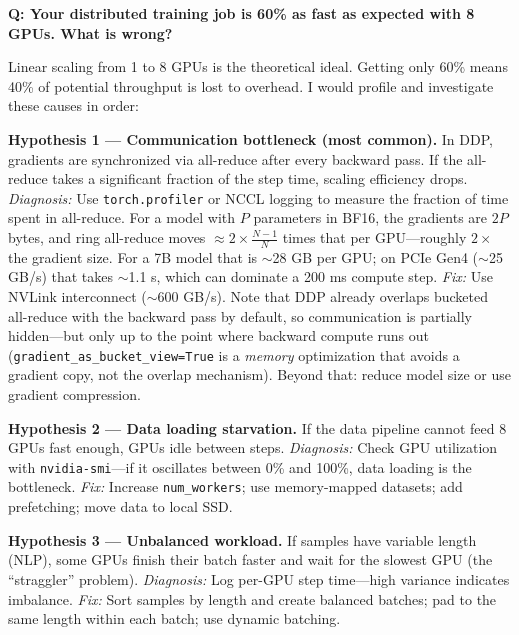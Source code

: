\begin{interviewq}
\textbf{Q: Your distributed training job is 60\% as fast as expected with 8 GPUs. What is wrong?}

 \quad {} \quad \badgefreq{\freqmed}

\stronganswer

Linear scaling from 1 to 8 GPUs is the theoretical ideal. Getting only 60\% means 40\% of potential throughput is lost to overhead. I would profile and investigate these causes in order:

\textbf{Hypothesis 1 --- Communication bottleneck (most common).} In DDP, gradients are synchronized via all-reduce after every backward pass. If the all-reduce takes a significant fraction of the step time, scaling efficiency drops. \textit{Diagnosis:} Use \texttt{torch.profiler} or NCCL logging to measure the fraction of time spent in all-reduce. For a model with $P$ parameters in BF16, the gradients are $2P$ bytes, and ring all-reduce moves $\approx 2 \times \frac{N-1}{N}$ times that per GPU---roughly $2\times$ the gradient size. For a 7B model that is $\sim$28 GB per GPU; on PCIe Gen4 ($\sim$25 GB/s) that takes $\sim$1.1 s, which can dominate a 200 ms compute step. \textit{Fix:} Use NVLink interconnect ($\sim$600 GB/s). Note that DDP already overlaps bucketed all-reduce with the backward pass by default, so communication is partially hidden---but only up to the point where backward compute runs out (\texttt{gradient\_as\_bucket\_view=True} is a \textit{memory} optimization that avoids a gradient copy, not the overlap mechanism). Beyond that: reduce model size or use gradient compression.

\textbf{Hypothesis 2 --- Data loading starvation.} If the data pipeline cannot feed 8 GPUs fast enough, GPUs idle between steps. \textit{Diagnosis:} Check GPU utilization with \texttt{nvidia-smi}---if it oscillates between 0\% and 100\%, data loading is the bottleneck. \textit{Fix:} Increase \texttt{num\_workers}; use memory-mapped datasets; add prefetching; move data to local SSD.

\textbf{Hypothesis 3 --- Unbalanced workload.} If samples have variable length (NLP), some GPUs finish their batch faster and wait for the slowest GPU (the ``straggler'' problem). \textit{Diagnosis:} Log per-GPU step time---high variance indicates imbalance. \textit{Fix:} Sort samples by length and create balanced batches; pad to the same length within each batch; use dynamic batching.


\end{interviewq}
